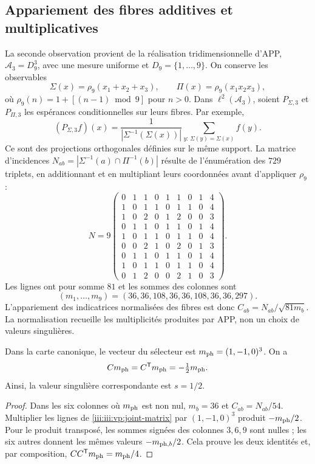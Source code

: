 \subsection{Appariement des fibres additives et multiplicatives}

La seconde observation provient de la réalisation tridimensionnelle d’APP,
$\mathcal A_3=D_9^3$, avec une mesure uniforme et
$D_9=\{1,\ldots,9\}$. On conserve les observables
\[
 \Sigma(x)=\rho_9(x_1+x_2+x_3),\qquad
 \Pi(x)=\rho_9(x_1x_2x_3),
\]
où $\rho_9(n)=1+[(n-1)\bmod9]$ pour $n>0$. Dans
$\ell^2(\mathcal A_3)$, soient $P_{\Sigma,3}$ et $P_{\Pi,3}$ les
espérances conditionnelles sur leurs fibres. Par exemple,
\[
 (P_{\Sigma,3}f)(x)=
 \frac1{|\Sigma^{-1}(\Sigma(x))|}
 \sum_{y:\,\Sigma(y)=\Sigma(x)}f(y).
\]
Ce sont des projections orthogonales définies sur le même support. La matrice
d’incidences $N_{ab}=|\Sigma^{-1}(a)\cap\Pi^{-1}(b)|$ résulte de
l’énumération des $729$ triplets, en additionnant et en multipliant leurs coordonnées avant
d’appliquer $\rho_9$ :
\begin{equation}
 N=9\begin{pmatrix}
 0&1&1&0&1&1&0&1&4\\
 1&0&1&1&0&1&1&0&4\\
 1&0&2&0&1&2&0&0&3\\
 0&1&1&0&1&1&0&1&4\\
 1&0&1&1&0&1&1&0&4\\
 0&0&2&1&0&2&0&1&3\\
 0&1&1&0&1&1&0&1&4\\
 1&0&1&1&0&1&1&0&4\\
 0&1&2&0&0&2&1&0&3
 \end{pmatrix}.
 \label{iii:iii:vp:joint-matrix}
\end{equation}
Les lignes ont pour somme $81$ et les sommes des colonnes sont
\[
 (m_1,\ldots,m_9)=(36,36,108,36,36,108,36,36,297).
\]
L’appariement des indicatrices normalisées des fibres
est donc $C_{ab}=N_{ab}/\sqrt{81m_b}$. La normalisation recueille les
multiplicités produites par APP, non un choix de valeurs singulières.

\begin{proposition}
Dans la carte canonique, le vecteur du sélecteur est $m_{\rm ph}=(1,-1,0)^3$. On a
\begin{equation}
 Cm_{\rm ph}=C^{\mathsf T}m_{\rm ph}=-\tfrac12m_{\rm ph}.
 \label{iii:iii:vp:trit-mode}
\end{equation}
Ainsi, la valeur singulière correspondante est $s=1/2$.
\end{proposition}
\begin{proof}
Dans les six colonnes où $m_{\rm ph}$ est non nul, $m_b=36$ et
$C_{ab}=N_{ab}/54$. Multiplier les lignes de
\eqref{iii:iii:vp:joint-matrix} par $(1,-1,0)^3$ produit
$-m_{\rm ph}/2$. Pour le produit transposé, les sommes signées
des colonnes $3,6,9$ sont nulles ; les six autres donnent les mêmes
valeurs $-m_{{\rm ph},b}/2$. Cela prouve les deux identités et, par
composition, $CC^{\mathsf T}m_{\rm ph}=m_{\rm ph}/4$.
\end{proof}

